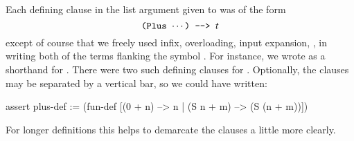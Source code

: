 Each defining clause in the list argument given to 
was of the form $$\mbox{\tt (Plus $\cdots$) \mbox{\tt -}\mbox{\tt -}> $t$}$$  except of course
that we freely used infix, overloading, input expansion, \etc, 
in writing both of the terms flanking the symbol \mtt{-}\mtt{->}.
For instance, we wrote  as a shorthand for . 
There were two such defining clauses for . Optionally, the 
clauses may be separated by a vertical bar, so we could have written:
\begin{tcAthena}
assert plus-def :=
    (fun-def [(0 + n) --> n
            | (S n + m) --> (S (n + m))])
\end{tcAthena}
For longer definitions this helps to demarcate the clauses a little more clearly. 

